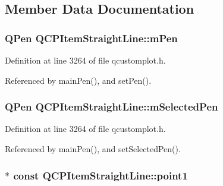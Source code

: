 \subsection{Member Data Documentation}
\hypertarget{class_q_c_p_item_straight_line_a15106ddc2ebd73ed5c1bc57aa92bee8f}{}
\subsubsection[{m\+Pen}]{\setlength{\rightskip}{0pt plus 5cm}Q\+Pen Q\+C\+P\+Item\+Straight\+Line\+::m\+Pen\hspace{0.3cm}{\ttfamily [protected]}}\label{class_q_c_p_item_straight_line_a15106ddc2ebd73ed5c1bc57aa92bee8f}


Definition at line 3264 of file qcustomplot.\+h.



Referenced by main\+Pen(), and set\+Pen().

\hypertarget{class_q_c_p_item_straight_line_a0307a0d56a018656adbf798bc84c2a4b}{}
\subsubsection[{m\+Selected\+Pen}]{\setlength{\rightskip}{0pt plus 5cm}Q\+Pen Q\+C\+P\+Item\+Straight\+Line\+::m\+Selected\+Pen\hspace{0.3cm}{\ttfamily [protected]}}\label{class_q_c_p_item_straight_line_a0307a0d56a018656adbf798bc84c2a4b}


Definition at line 3264 of file qcustomplot.\+h.



Referenced by main\+Pen(), and set\+Selected\+Pen().

\hypertarget{class_q_c_p_item_straight_line_ac131a6ffe456f2cc7364dce541fe0120}{}
\subsubsection[{point1}]{$\ast$ const Q\+C\+P\+Item\+Straight\+Line\+::point1}\label{class_q_c_p_item_straight_line_ac131a6ffe456f2cc7364dce541fe0120}



